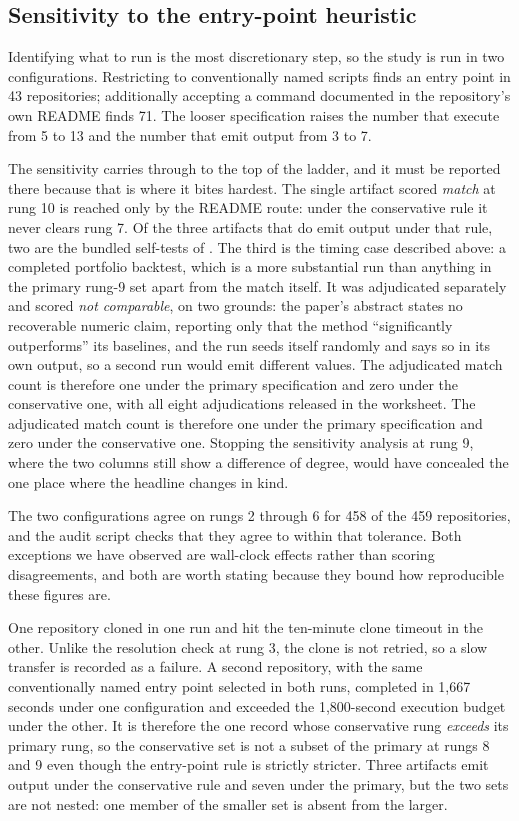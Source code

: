 \subsection{Sensitivity to the entry-point heuristic}\label{sec:sensitivity}

Identifying what to run is the most discretionary step, so the study is run in two
configurations. Restricting to conventionally named scripts finds an entry point
in 43 repositories; additionally accepting a command documented in the
repository's own README finds 71. The looser specification raises the number that
execute from 5 to 13 and the number that emit output from 3 to 7.

The sensitivity carries through to the top of the ladder, and it must be reported
there because that is where it bites hardest. The single artifact scored
\emph{match} at rung 10 is reached only by the README route: under the
conservative rule it never clears rung 7. Of the three artifacts that do emit
output under that rule, two are the bundled self-tests of
. The third is the timing case described above: a
completed portfolio backtest, which is a more substantial run than anything in
the primary rung-9 set apart from the match itself. It was adjudicated
separately and scored \emph{not comparable}, on two grounds: the paper's abstract
states no recoverable numeric claim, reporting only that the method
``significantly outperforms'' its baselines, and the run seeds itself randomly
and says so in its own output, so a second run would emit different values. The
adjudicated match count is therefore one under the primary specification and zero
under the conservative one, with all eight adjudications released in the
worksheet. The adjudicated match count is therefore one under the
primary specification and zero under the conservative one. Stopping the sensitivity analysis at rung 9, where the two columns still
show a difference of degree, would have concealed the one place where the
headline changes in kind.

The two configurations agree on rungs 2 through 6 for 458 of the 459
repositories, and the audit script checks that they agree to within that
tolerance. Both exceptions we have observed are wall-clock effects rather than
scoring disagreements, and both are worth stating because they bound how
reproducible these figures are.

One repository cloned in one run and hit the ten-minute clone timeout in the
other. Unlike the resolution check at rung 3, the clone is not retried, so a slow
transfer is recorded as a failure. A second repository, with the same
conventionally named entry point selected in both runs, completed in 1{,}667
seconds under one configuration and exceeded the 1{,}800-second execution budget
under the other. It is therefore the one record whose conservative rung
\emph{exceeds} its primary rung, so the conservative set is not a subset of the
primary at rungs 8 and 9 even though the entry-point rule is strictly stricter.
Three artifacts emit output under the conservative rule and seven under the
primary, but the two sets are not nested: one member of the smaller set is absent
from the larger.

